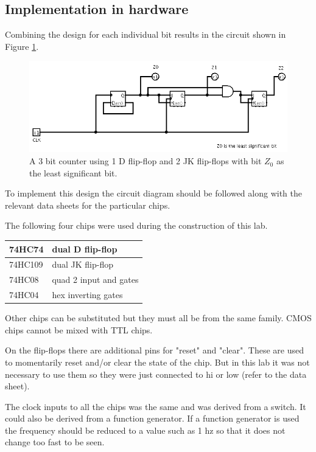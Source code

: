\documentclass[12pt]{article}
\begin{document}

\subsection{Implementation in hardware}

Combining the design for each individual bit results in the circuit
shown in Figure \ref{fig:circ01}.

\begin{figure}
\center
\includegraphics[scale=0.5]{3bit-counter-1D-2JK}
\caption{A 3 bit counter using 1 D flip-flop and 2 JK flip-flops
with bit $Z_0$ as the least significant bit.}\label{fig:circ01}
\end{figure}

To implement this design the circuit diagram should be followed
along with the relevant data sheets for the particular chips.

The following four chips were used during the construction of this lab.

\begin{tabular}{|l|l|}
\hline
74HC74 & dual D flip-flop \\
\hline
74HC109 & dual JK flip-flop \\
\hline
74HC08 & quad 2 input and gates \\
\hline
74HC04 & hex inverting gates \\
\hline
\end{tabular}

Other chips can be substituted but they must all be from the same
family.
CMOS chips cannot be mixed with TTL chips.

On the flip-flops there are additional pins for "reset" and "clear".
These are used to momentarily reset and/or clear the state of the chip.
But in this lab it was not necessary to use them so they were just connected
to hi or low (refer to the data sheet).

The clock inputs to all the chips was the same and was derived from
a switch.
It could also be derived from a function generator.
If a function generator is used the frequency should be reduced
to a value such as 1 hz so that it does not change too fast to be seen.
\end{document}
